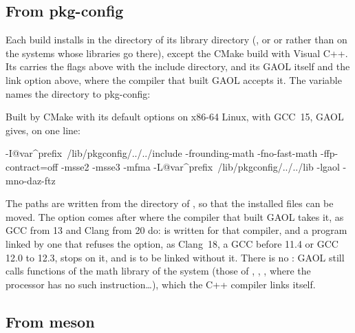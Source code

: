 \subsection{From pkg-config}\label{sec:compiling-pkgconfig}
%

Each build installs  in the  directory of its
library directory (, or  or
 rather than  on the systems whose
libraries go there), except the CMake build with Visual C++. Its
 carries the flags above with the include directory, and its
 GAOL itself and the link option above, where the compiler that
built GAOL accepts it. The variable  names the
directory to pkg-config:


\noindent
Built by CMake with its default options on x86-64 Linux, with GCC~15, GAOL
gives, on one line:

\begin{cmdshell}
-I@var^prefix~/lib/pkgconfig/../../include -frounding-math -fno-fast-math
-ffp-contract=off -msse2 -msse3 -mfma -L@var^prefix~/lib/pkgconfig/../../lib -lgaol -mno-daz-ftz
\end{cmdshell}

\noindent
The paths are written from the directory of , so that the
installed files can be moved. The option  comes after
 where the compiler that built GAOL takes it, as GCC from 13 and
Clang from 20 do:  is written for that
compiler, and a program linked by one that refuses the option, as Clang~18, a
GCC before 11.4 or GCC 12.0 to 12.3, stops on it, and is to be linked without
it. There is no : GAOL still calls functions of the math library of
the system (those of , , ,
 where the processor has no such instruction\ldots), which the
C++ compiler links itself.\newinvfive

\subsection{From meson}\label{sec:compiling-meson}
%

